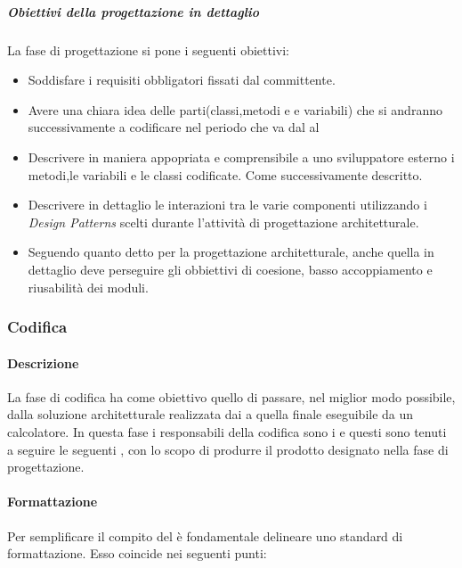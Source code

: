 \subparagraph{Obiettivi della progettazione in dettaglio}
La fase di progettazione si pone i seguenti obiettivi:
\begin{itemize}
\item Soddisfare i requisiti obbligatori fissati dal committente.
\item Avere una chiara idea delle parti(classi,metodi e e variabili) che si andranno successivamente a codificare nel periodo che va dal \RP al \RQ
\item Descrivere in maniera appopriata e comprensibile a uno sviluppatore esterno i metodi,le variabili e le classi codificate. Come successivamente descritto.
\item Descrivere in dettaglio le interazioni tra le varie componenti utilizzando i \textit{Design Patterns} scelti durante l'attività di progettazione architetturale.
\item Seguendo quanto detto per la progettazione architetturale, anche quella in dettaglio deve perseguire gli obbiettivi di coesione, basso accoppiamento e riusabilità dei moduli.
\end{itemize}

\subsubsection{Codifica}
\paragraph{Descrizione}
La fase di codifica ha come obiettivo quello di passare, nel miglior modo possibile, dalla soluzione architetturale realizzata dai \textit{\ProgP} a quella finale eseguibile da un calcolatore.
In questa fase i responsabili della codifica sono i \textit{\ProgrP} e questi sono tenuti a seguire le seguenti , con lo scopo di produrre il prodotto designato nella fase di progettazione.

\paragraph{Formattazione}
Per semplificare il compito del \textit{\Progr} è fondamentale delineare uno standard di formattazione.
Esso coincide nei seguenti punti:

